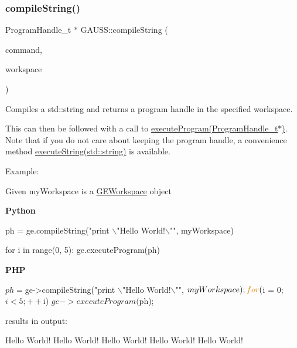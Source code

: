 \subsubsection{\texorpdfstring{compile\+String()}{compileString()}\hspace{0.1cm}{\footnotesize\ttfamily [2/2]}}
{\footnotesize\ttfamily Program\+Handle\+\_\+t $\ast$ G\+A\+U\+S\+S\+::compile\+String (\begin{DoxyParamCaption}\item[{std\+::string}]{command,  }\item[{\hyperlink{class_g_e_workspace}{G\+E\+Workspace} $\ast$}]{workspace }\end{DoxyParamCaption})}



Compiles a std\+::string and returns a program handle in the specified workspace. 

This can then be followed with a call to \hyperlink{class_g_a_u_s_s_a7fc9de69421c14aadb9a6310fecabcca}{execute\+Program(\+Program\+Handle\+\_\+t$\ast$)}. Note that if you do not care about keeping the program handle, a convenience method \hyperlink{class_g_a_u_s_s_a3680b0addd695d8a5690a1e2d3fc0d8b}{execute\+String(std\+::string)} is available.

Example\+:

Given {\ttfamily my\+Workspace} is a \hyperlink{class_g_e_workspace}{G\+E\+Workspace} object

{\bfseries Python} 
\begin{DoxyCode}
ph = ge.compileString(\textcolor{stringliteral}{"print \(\backslash\)"Hello World!\(\backslash\)""}, myWorkspace)

\textcolor{keywordflow}{for} i \textcolor{keywordflow}{in} range(0, 5):
    ge.executeProgram(ph)
\end{DoxyCode}


{\bfseries P\+HP} 
\begin{DoxyCode}
$ph = $ge->compileString(\textcolor{stringliteral}{"print \(\backslash\)"Hello World!\(\backslash\)""}, $myWorkspace);

\textcolor{keywordflow}{for} ($i = 0; $i < 5; ++$i)
    $ge->executeProgram($ph);
\end{DoxyCode}
 results in output\+: 
\begin{DoxyCode}
Hello World!
Hello World!
Hello World!
Hello World!
Hello World!
\end{DoxyCode}



